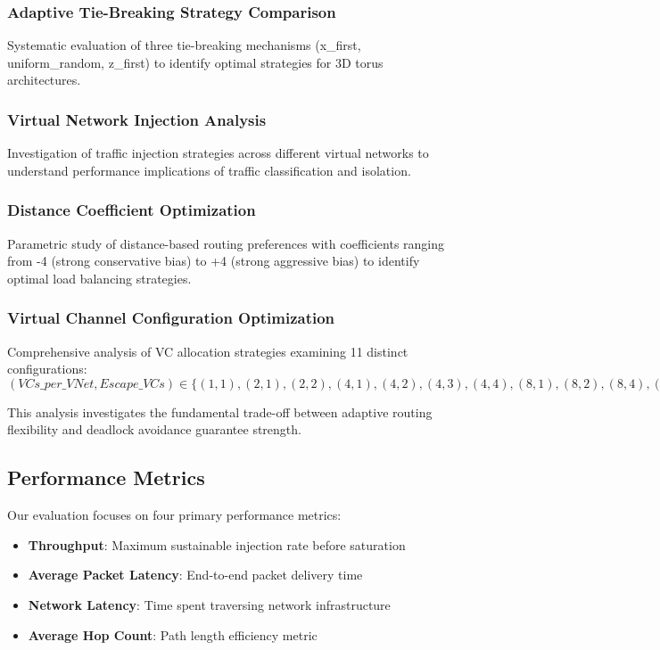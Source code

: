 \documentclass[a4paper,12pt]{article}
\begin{document}
\subsubsection{Adaptive Tie-Breaking Strategy Comparison}
Systematic evaluation of three tie-breaking mechanisms (x\_first, uniform\_random, z\_first) to identify optimal strategies for 3D torus architectures.

\subsubsection{Virtual Network Injection Analysis}
Investigation of traffic injection strategies across different virtual networks to understand performance implications of traffic classification and isolation.

\subsubsection{Distance Coefficient Optimization}
Parametric study of distance-based routing preferences with coefficients ranging from -4 (strong conservative bias) to +4 (strong aggressive bias) to identify optimal load balancing strategies.

\subsubsection{Virtual Channel Configuration Optimization}
Comprehensive analysis of VC allocation strategies examining 11 distinct configurations:
$(VCs\_per\_VNet, Escape\_VCs) \in \{(1,1), (2,1), (2,2), (4,1), (4,2), (4,3), (4,4), (8,1), (8,2), (8,4), (8,8)\}$

This analysis investigates the fundamental trade-off between adaptive routing flexibility and deadlock avoidance guarantee strength.

\subsection{Performance Metrics}
Our evaluation focuses on four primary performance metrics:

\begin{itemize}
    \item \textbf{Throughput}: Maximum sustainable injection rate before saturation
    \item \textbf{Average Packet Latency}: End-to-end packet delivery time
    \item \textbf{Network Latency}: Time spent traversing network infrastructure
    \item \textbf{Average Hop Count}: Path length efficiency metric
\end{itemize}
\end{document}

